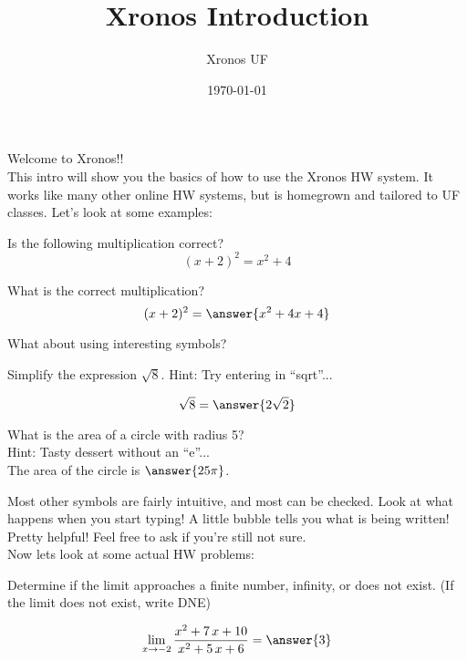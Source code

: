 \documentclass[]{ximera}
\title{Xronos Introduction}
\author{Xronos UF}
\date{\today}
\begin{document}
\maketitle


{\huge Welcome to Xronos!!}\\
\large
This intro will show you the basics of how to use the Xronos HW system.  It works like many other online HW systems, but is homegrown and tailored to UF classes.  Let's look at some examples:


\begin{problem}

Is the following multiplication correct?
\[(x+2)^2 = x^2+4\]
\begin{multipleChoice}
\end{multipleChoice}
\end{problem}

\begin{problem}
What is the correct multiplication?
\[(x+2)^2=\answer{x^2+4x+4}\]


\end{problem}


What about using interesting symbols?

\begin{problem}
Simplify the expression $\sqrt{8}$.  Hint:  Try entering in ``sqrt''... 

\[\sqrt{8}=\answer{2\sqrt{2}}\]

\end{problem}

\begin{problem}
What is the area of a circle with radius 5? \\ Hint: Tasty dessert without an ``e''... \\

The area of the circle is $\answer{25\pi}$.

\end{problem}


Most other symbols are fairly intuitive, and most can be checked.  Look at what happens when you start typing!  A little bubble tells you what is being written!  Pretty helpful!  Feel free to ask if you're still not sure.\\

Now lets look at some actual HW problems:

\begin{problem}
Determine if the limit approaches a finite number, infinity, or does not exist. (If the limit does not exist, write DNE)

\[\lim_{x\to{-2}}\dfrac{x^{2} + 7 \, x + 10}{x^{2} + 5 \, x + 6}=\answer{3}\]
\end{problem}
\end{document}
